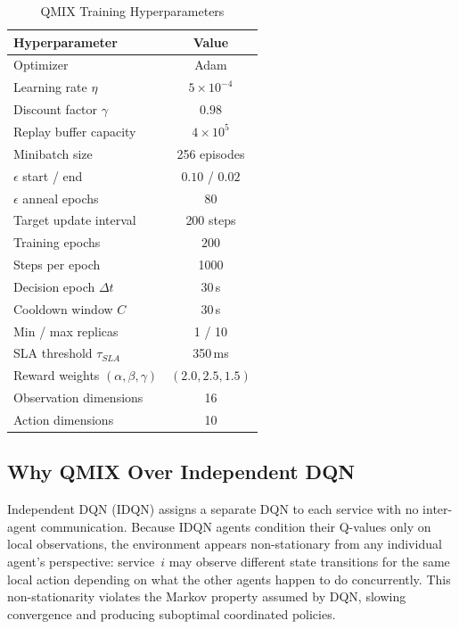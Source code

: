 \documentclass[conference]{IEEEtran}
\begin{document}
\begin{table}[t]
\centering
\caption{QMIX Training Hyperparameters}
\label{tab:hyperparams}
\setlength{\tabcolsep}{6pt}
\begin{tabular}{lc}
\toprule
\textbf{Hyperparameter} & \textbf{Value} \\
\midrule
Optimizer                    & Adam \\
Learning rate $\eta$         & $5 \times 10^{-4}$ \\
Discount factor $\gamma$     & $0.98$ \\
Replay buffer capacity       & $4 \times 10^5$ \\
Minibatch size               & 256 episodes \\
$\epsilon$ start / end       & $0.10$ / $0.02$ \\
$\epsilon$ anneal epochs     & $80$ \\
Target update interval       & 200 steps \\
Training epochs              & $200$ \\
Steps per epoch              & 1000 \\
Decision epoch $\Delta t$    & 30\,s \\
Cooldown window $C$          & 30\,s \\
Min / max replicas           & 1 / 10 \\
SLA threshold $\tau_{SLA}$   & 350\,ms \\
Reward weights $(\alpha,\beta,\gamma)$ & $(2.0, 2.5, 1.5)$ \\
Observation dimensions       & 16 \\
Action dimensions            & 10 \\
\bottomrule
\end{tabular}
\end{table}

\subsection{Why QMIX Over Independent DQN}

Independent DQN (IDQN) assigns a separate DQN to each service
with no inter-agent communication. Because IDQN agents condition
their Q-values only on local observations, the environment appears
non-stationary from any individual agent's perspective: service~$i$
may observe different state transitions for the same local action
depending on what the other agents happen to do concurrently. This
non-stationarity violates the Markov property assumed by DQN,
slowing convergence and producing suboptimal coordinated policies.
\end{document}
